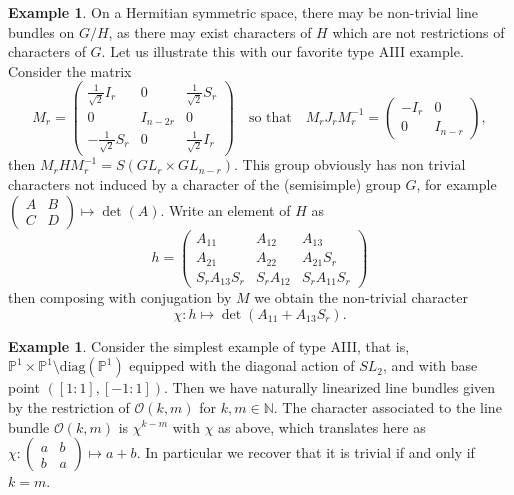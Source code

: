 \documentclass{amsart}
\theoremstyle{definition}
\newtheorem{exa}[thm]{Example}
\begin{document}
\begin{exa}
\label{exa_isotropy_AIII}
On a Hermitian symmetric space, there may be non-trivial line bundles 
on $G/H$, as there may exist characters of $H$ which are not restrictions 
of characters of $G$. Let us illustrate this with our favorite type AIII 
example. 
Consider the matrix 
\[
M_r=\begin{pmatrix} 
\frac{1}{\sqrt{2}}I_r&0&\frac{1}{\sqrt{2}}S_r\\
0&I_{n-2r}&0\\
-\frac{1}{\sqrt{2}}S_r&0&\frac{1}{\sqrt{2}}I_r
\end{pmatrix}
\quad
\text{so that} 
\quad
M_rJ_rM_r^{-1}=\begin{pmatrix} -I_{r}&0\\0&I_{n-r}\end{pmatrix},
\]
then $M_rHM_r^{-1}=S(GL_{r}\times GL_{n-r})$.
This group obviously has non trivial 
characters not induced by a character of the (semisimple) group $G$, for example
$
(\begin{smallmatrix} A&B\\C&D \end{smallmatrix}) \mapsto \det(A).
$
Write an element of $H$ as 
\[
h=\begin{pmatrix}A_{11}&A_{12}&A_{13}\\A_{21}&A_{22}&A_{21}S_r\\S_rA_{13}S_r&S_rA_{12}&S_rA_{11}S_r\end{pmatrix}
\]
then composing with conjugation by $M$ we obtain the non-trivial 
character 
\[
\chi:h\mapsto \det(A_{11}+A_{13}S_r).
\]
\end{exa}

\begin{exa}
\label{exa_isotropy_P1xP1}
Consider the simplest example of type AIII, that is, 
$\mathbb{P}^1\times \mathbb{P}^1\setminus \mathrm{diag}(\mathbb{P}^1)$
equipped with the diagonal action of $SL_2$, and with base 
point $([1:1],[-1:1])$.
Then we have naturally linearized line bundles given by the 
restriction of $\mathcal{O}(k,m)$ for $k,m\in \mathbb{N}$.
The character associated to the line bundle $\mathcal{O}(k,m)$ is $\chi^{k-m}$ 
with $\chi$ as above, which translates here as 
$\chi:(\begin{smallmatrix}a&b\\b&a\end{smallmatrix}) \mapsto a+b$.
In particular we recover that it is trivial if and only if $k=m$.
\end{exa}
\end{document}
